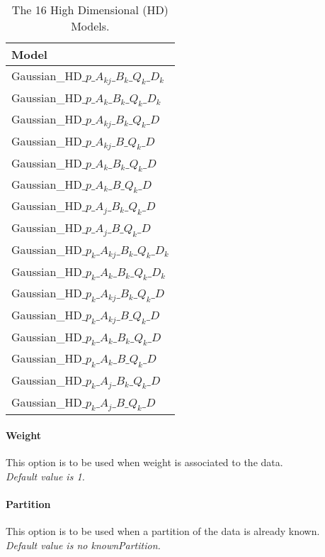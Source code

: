 \begin{table}[!h]
\caption{The 16 High Dimensional (HD) Models.}
{\small
\label{16models}
\begin{center}
\begin{tabular}{|l|}
\hline
Model \\
\hline
Gaussian\_HD$\_p\_A_{kj}\_B_k\_Q_k\_D_k$ \\
Gaussian\_HD$\_p\_A_{k}\_B_k\_Q_k\_D_k$ \\
Gaussian\_HD$\_p\_A_{kj}\_B_k\_Q_k\_D$ \\
Gaussian\_HD$\_p\_A_{kj}\_B\_Q_k\_D$ \\
Gaussian\_HD$\_p\_A_{k}\_B_k\_Q_k\_D$ \\
Gaussian\_HD$\_p\_A_{k}\_B\_Q_k\_D$ \\
Gaussian\_HD$\_p\_A_{j}\_B_k\_Q_k\_D$ \\
Gaussian\_HD$\_p\_A_{j}\_B\_Q_k\_D$ \\
Gaussian\_HD$\_p_k\_A_{kj}\_B_k\_Q_k\_D_k$ \\
Gaussian\_HD$\_p_k\_A_{k}\_B_k\_Q_k\_D_k$ \\
Gaussian\_HD$\_p_k\_A_{kj}\_B_k\_Q_k\_D$ \\
Gaussian\_HD$\_p_k\_A_{kj}\_B\_Q_k\_D$ \\
Gaussian\_HD$\_p_k\_A_{k}\_B_k\_Q_k\_D$ \\
Gaussian\_HD$\_p_k\_A_{k}\_B\_Q_k\_D$ \\
Gaussian\_HD$\_p_k\_A_{j}\_B_k\_Q_k\_D$ \\
Gaussian\_HD$\_p_k\_A_{j}\_B\_Q_k\_D$ \\
\hline
\end{tabular}
\end{center}}
\end{table}




\paragraph{Weight}
This option is to be used when weight is associated to the data.\\
{\it Default value is 1.}

\paragraph{Partition}
This option is to be used when a partition of the data is already known. \\
{\it Default value is no knownPartition.}


